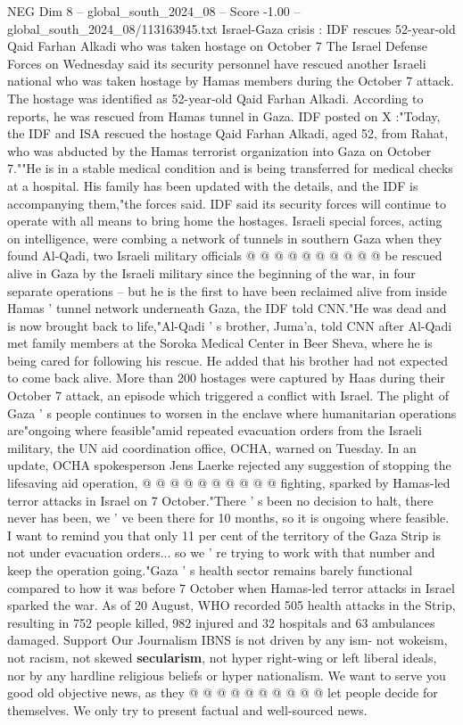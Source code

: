 \begin{textsample}{NEG Dim 8 – global\_south\_2024\_08 – Score -1.00 – global\_south\_2024\_08/113163945.txt}  \label{ex:f8_neg_288}
Israel-Gaza crisis : IDF rescues 52-year-old Qaid Farhan Alkadi who was taken hostage on October 7 The Israel Defense Forces on Wednesday said its security personnel have rescued another Israeli national who was taken hostage by Hamas members during the October 7 attack.
The hostage was identified as 52-year-old Qaid Farhan Alkadi.
According to reports, he was rescued from Hamas tunnel in Gaza.
IDF posted on X :"Today, the IDF and ISA rescued the hostage Qaid Farhan Alkadi, aged 52, from Rahat, who was abducted by the Hamas terrorist organization into Gaza on October 7.""He is in a stable medical condition and is being transferred for medical checks at a hospital.
His family has been updated with the details, and the IDF is accompanying them,"the forces said.
IDF said its security forces will continue to operate with all means to bring home the hostages.
Israeli special forces, acting on intelligence, were combing a network of tunnels in southern Gaza when they found Al-Qadi, two Israeli military officials @ @ @ @ @ @ @ @ @ @ be rescued alive in Gaza by the Israeli military since the beginning of the war, in four separate operations -- but he is the first to have been reclaimed alive from inside Hamas ' tunnel network underneath Gaza, the IDF told CNN."He was dead and is now brought back to life,"Al-Qadi ' s brother, Juma'a, told CNN after Al-Qadi met family members at the Soroka Medical Center in Beer Sheva, where he is being cared for following his rescue.
He added that his brother had not expected to come back alive.
More than 200 hostages were captured by Haas during their October 7 attack, an episode which triggered a conflict with Israel.
The plight of Gaza ' s people continues to worsen in the enclave where humanitarian operations are"ongoing where feasible"amid repeated evacuation orders from the Israeli military, the UN aid coordination office, OCHA, warned on Tuesday.
In an update, OCHA spokesperson Jens Laerke rejected any suggestion of stopping the lifesaving aid operation, @ @ @ @ @ @ @ @ @ @ fighting, sparked by Hamas-led terror attacks in Israel on 7 October."There ' s been no decision to halt, there never has been, we ' ve been there for 10 months, so it is ongoing where feasible.
I want to remind you that only 11 per cent of the territory of the Gaza Strip is not under evacuation orders... so we ' re trying to work with that number and keep the operation going."Gaza ' s health sector remains barely functional compared to how it was before 7 October when Hamas-led terror attacks in Israel sparked the war.
As of 20 August, WHO recorded 505 health attacks in the Strip, resulting in 752 people killed, 982 injured and 32 hospitals and 63 ambulances damaged.
Support Our Journalism IBNS is not driven by any ism- not wokeism, not racism, not skewed \textbf{secularism}, not hyper right-wing or left liberal ideals, nor by any hardline religious beliefs or hyper nationalism.
We want to serve you good old objective news, as they @ @ @ @ @ @ @ @ @ @ let people decide for themselves.
We only try to present factual and well-sourced news.

\end{textsample}
